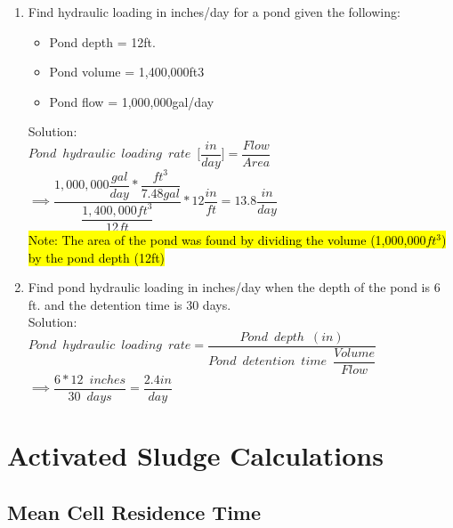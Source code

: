 \begin{enumerate}

\item Find hydraulic loading in inches/day for a pond given the following:
\begin{itemize}
\item Pond depth = 12ft.
\item Pond volume = 1,400,000ft3
\item Pond flow = 1,000,000gal/day
\end{itemize}
Solution:\\
$Pond \enspace hydraulic \enspace loading \enspace rate \enspace \Bigg[\dfrac{in}{day}\Bigg]=\dfrac{Flow}{Area}$\\
$ \implies\dfrac{1,000,000\dfrac{gal}{day}*\dfrac{ft^3 }{7.48gal}}{\dfrac{1,400,000ft^3}{12ft}}*12\dfrac{in}{ft}=\boxed{13.8\dfrac{in}{day}}$\\
\vspace{0.3cm}
\hl{Note:  The area of the pond was found by dividing the volume (1,000,000$ft^3$) by the pond depth (12ft)}
\vspace{0.3cm}

\item Find pond hydraulic loading in inches/day when the depth of the pond is 6 ft. and the detention time is 30 days.\\
Solution:\\



$Pond \enspace hydraulic \enspace loading \enspace rate=\dfrac{Pond \enspace depth \enspace (in)}{Pond \enspace detention  \enspace time \enspace \dfrac{Volume}{Flow}}$\\
$\implies \dfrac{6*12 \enspace inches}{30 \enspace days}=\boxed{\dfrac{2.4in}{day}}$
\end{enumerate}


\section{Activated Sludge Calculations} 
\subsection{Mean Cell Residence Time}


